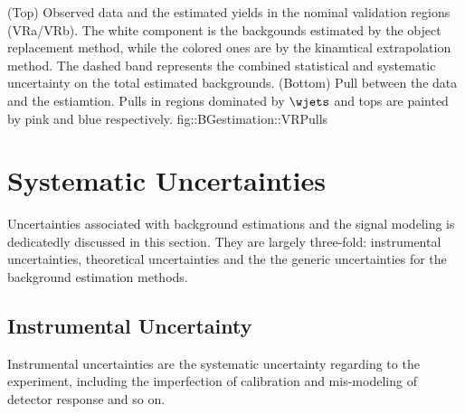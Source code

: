 {(Top) Observed data and the estimated yields in the nominal validation regions (VRa/VRb). 
The white component is the backgounds estimated by the object replacement method, while the colored ones are by the kinamtical extrapolation method. The dashed band represents the combined statistical and systematic uncertainty on the total estimated backgrounds. (Bottom) Pull between the data and the estiamtion. Pulls in regions dominated by $\wjets$ and tops are painted by pink and blue respectively.}
{fig::BGestimation::VRPulls}


\clearpage
\section{Systematic Uncertainties}  \label{sec::Uncertainties}
Uncertainties associated with background estimations and the signal modeling is dedicatedly discussed in this section.
They are largely three-fold: instrumental uncertainties, theoretical uncertainties and the the generic uncertainties for the background estimation methods. \\

\subsection{Instrumental Uncertainty}
Instrumental uncertainties are the systematic uncertainty regarding to the experiment, including the imperfection of calibration and mis-modeling of detector response and so on.
  
